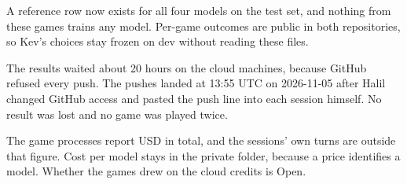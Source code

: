 \documentclass{labreport}
\begin{document}
\lrchanges
A reference row now exists for all four models on the test set, and nothing from these games trains any model.
Per-game outcomes are public in both repositories, so Kev's choices stay frozen on dev without reading these files.

\lrfailures
The results waited about 20 hours on the cloud machines, because GitHub refused every push.
The pushes landed at 13:55 UTC on 2026-11-05 after Halil changed GitHub access and pasted the push line into each session himself.
No result was lost and no game was played twice.

\lrcost
The game processes report  USD in total, and the sessions' own turns are outside that figure.
Cost per model stays in the private folder, because a price identifies a model.
Whether the games drew on the cloud credits is Open.

\lrprovenance
\end{document}
